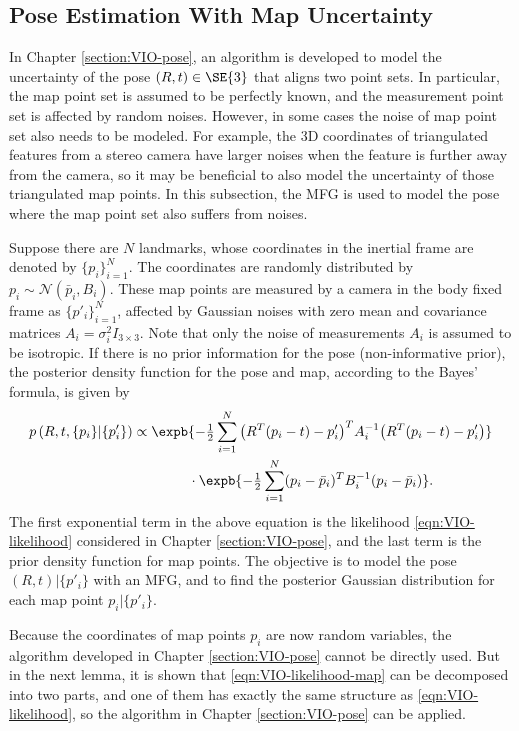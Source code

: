 \subsection{Pose Estimation With Map Uncertainty} \label{section:VIO-pose-map}

In Chapter \ref{section:VIO-pose}, an algorithm is developed to model the uncertainty of the pose $(R,t)\in\SE{3}$ that aligns two point sets.
In particular, the map point set is assumed to be perfectly known, and the measurement point set is affected by random noises.
However, in some cases the noise of map point set also needs to be modeled.
For example, the 3D coordinates of triangulated features from a stereo camera have larger noises when the feature is further away from the camera, so it may be beneficial to also model the uncertainty of those triangulated map points.
In this subsection, the MFG is used to model the pose where the map point set also suffers from noises.

Suppose there are $N$ landmarks, whose coordinates in the inertial frame are denoted by $\{p_i\}_{i=1}^N$.
The coordinates are randomly distributed by $p_i \sim \mathcal{N}(\bar{p}_i, B_i)$.
These map points are measured by a camera in the body fixed frame as $\{p'_i\}_{i=1}^N$, affected by Gaussian noises with zero mean and covariance matrices $A_i = \sigma_i^2I_{3\times 3}$.
Note that only the noise of measurements $A_i$ is assumed to be isotropic.
If there is no prior information for the pose (non-informative prior), the posterior density function for the pose and map, according to the Bayes' formula, is given by
\begin{align} \label{eqn:VIO-likelihood-map}
	p\left( R,t,\{p_i\} | \{p'_i\} \right) &\propto \expb{-\tfrac{1}{2} \sum_{i=1}^{N} \big(R^T(p_i-t)-p'_i\big)^T A_i^{-1} \big(R^T(p_i-t)-p'_i\big)} \nonumber \\
	&\qquad\qquad \cdot \expb{-\tfrac{1}{2}\sum_{i=1}^N (p_i-\bar{p}_i)^T B_i^{-1} (p_i-\bar{p}_i)}.
\end{align}
The first exponential term in the above equation is the likelihood \eqref{eqn:VIO-likelihood} considered in Chapter \ref{section:VIO-pose}, and the last term is the prior density function for map points.
The objective is to model the pose $(R,t)|\{p'_i\}$ with an MFG, and to find the posterior Gaussian distribution for each map point $p_i|\{p'_i\}$.

Because the coordinates of map points $p_i$ are now random variables, the algorithm developed in Chapter \ref{section:VIO-pose} cannot be directly used.
But in the next lemma, it is shown that \eqref{eqn:VIO-likelihood-map} can be decomposed into two parts, and one of them has exactly the same structure as \eqref{eqn:VIO-likelihood}, so the algorithm in Chapter \ref{section:VIO-pose} can be applied.


